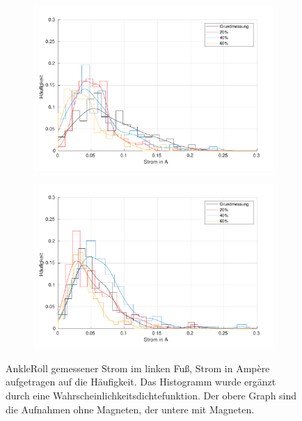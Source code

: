 \begin{figure}[tb]
	\centering
	\begin{subfigure}[c]{.9\linewidth}
		\centering
		\includegraphics[width=\linewidth]{Bilder/links_Current_AnkleRoll_ohneM.pdf}
	\end{subfigure}
	\begin{subfigure}[c]{.9\linewidth}
		\centering
		\includegraphics[width=\linewidth]{Bilder/links_Current_AnkleRoll_mitM.pdf}
	\end{subfigure}
	\caption{AnkleRoll gemessener Strom im linken Fuß, Strom in Ampère aufgetragen auf die Häufigkeit. Das Histogramm wurde ergänzt durch eine Wahrscheinlichkeitsdichtefunktion. Der obere Graph sind die Aufnahmen ohne Magneten, der untere mit Magneten.} \label{AnkleRoll_Current_links}
\end{figure}
